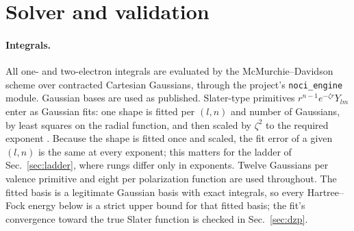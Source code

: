 \documentclass[aps,pra,twocolumn,superscriptaddress,longbibliography]{revtex4-2}
\begin{document}
\section{Solver and validation}
\label{sec:solver}

\paragraph{Integrals.}  All one- and two-electron integrals are
evaluated by the McMurchie--Davidson scheme \cite{mcmurchie1978} over
contracted Cartesian Gaussians, through the project's
\texttt{noci\_engine} module.  Gaussian bases are used as published.
Slater-type primitives $r^{n-1}e^{-\zeta r}Y_{lm}$ enter as Gaussian
fits: one shape is fitted per $(l,n)$ and number of Gaussians, by
least squares on the radial function, and then scaled by $\zeta^{2}$ to
the required exponent \cite{stewart1970}.  Because the shape is fitted
once and scaled, the fit error of a given $(l,n)$ is the same at every
exponent; this matters for the ladder of Sec.~\ref{sec:ladder}, where
rungs differ only in exponents.  Twelve Gaussians per valence primitive
and eight per polarization function are used throughout.  The fitted
basis is a legitimate Gaussian basis with exact integrals, so every
Hartree--Fock energy below is a strict upper bound for that fitted
basis; the fit's convergence toward the true Slater function is checked
in Sec.~\ref{sec:dzp}.
\end{document}

